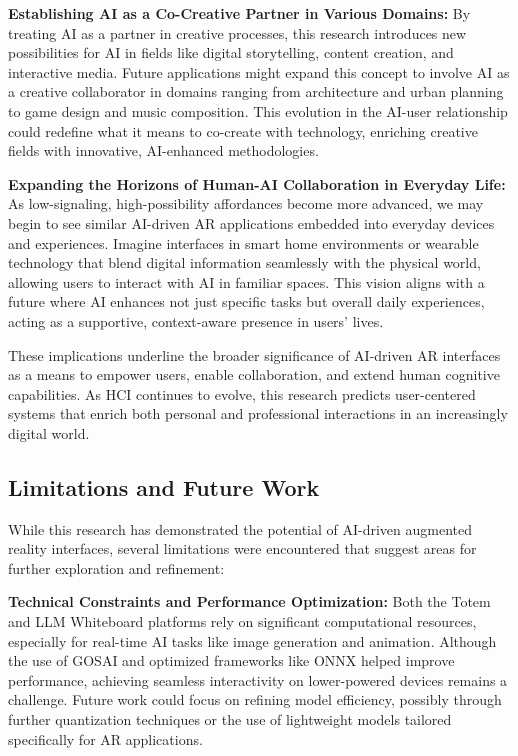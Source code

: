 \textbf{Establishing AI as a Co-Creative Partner in Various Domains:}
By treating AI as a partner in creative processes, this research introduces new possibilities for AI in fields like digital storytelling, content creation, and interactive media.
Future applications might expand this concept to involve AI as a creative collaborator in domains ranging from architecture and urban planning to game design and music composition.
This evolution in the AI-user relationship could redefine what it means to co-create with technology, enriching creative fields with innovative, AI-enhanced methodologies.

\textbf{Expanding the Horizons of Human-AI Collaboration in Everyday Life:}
As low-signaling, high-possibility affordances become more advanced, we may begin to see similar AI-driven AR applications embedded into everyday devices and experiences.
Imagine interfaces in smart home environments or wearable technology that blend digital information seamlessly with the physical world, allowing users to interact with AI in familiar spaces.
This vision aligns with a future where AI enhances not just specific tasks but overall daily experiences, acting as a supportive, context-aware presence in users' lives.

These implications underline the broader significance of AI-driven AR interfaces as a means to empower users, enable collaboration, and extend human cognitive capabilities.
As HCI continues to evolve, this research predicts user-centered systems that enrich both personal and professional interactions in an increasingly digital world.

\subsection{Limitations and Future Work}

While this research has demonstrated the potential of AI-driven augmented reality interfaces, several limitations were encountered that suggest areas for further exploration and refinement:

\textbf{Technical Constraints and Performance Optimization:}
Both the Totem and LLM Whiteboard platforms rely on significant computational resources, especially for real-time AI tasks like image generation and animation.
Although the use of GOSAI and optimized frameworks like ONNX helped improve performance, achieving seamless interactivity on lower-powered devices remains a challenge.
Future work could focus on refining model efficiency, possibly through further quantization techniques or the use of lightweight models tailored specifically for AR applications.

